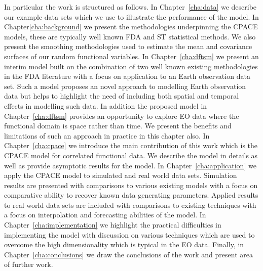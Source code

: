 In particular the work is structured as follows. In Chapter~\ref{cha:data} we describe our example data sets which we use to illustrate the performance of the model. In Chapter\ref{cha:background} we present the methodologies underpinning the CPACE models, these are typically well known FDA and ST statistical methods. We also present the smoothing methodologies used to estimate the mean and covariance surfaces of our random functional variables. In Chapter~\ref{cha:dftsm} we present an interim model built on the combination of two well known existing methodologies in the FDA literature with a focus on application to an Earth observation data set. Such a model proposes an novel approach to modelling Earth observation data but helps to highlight the need of including both spatial and temporal effects in modelling such data. In addition the proposed model in Chapter~\ref{cha:dftsm} provides an opportunity to explore EO data where the functional domain is space rather than time. We present the benefits and limitations of such an approach in practice in this chapter also. In Chapter~\ref{cha:cpace} we introduce the main contribution of this work which is the CPACE model for correlated functional data. We describe the model in details as well as provide asymptotic results for the model. In Chapter~\ref{cha:application} we apply the CPACE model to simulated and real world data sets. Simulation results are presented with comparisons to various existing models with a focus on comparative ability to recover known data generating parameters. Applied results to real world data sets are included with comparisons to existing techniques with a focus on interpolation and forecasting abilities of the model. In Chapter~\ref{cha:implementation} we highlight the practical difficulties in implementing the model with discussion on various techniques which are used to overcome the high dimensionality which is typical in the EO data. Finally, in Chapter~\ref{cha:conclusions} we draw the conclusions of the work and present area of further work. 